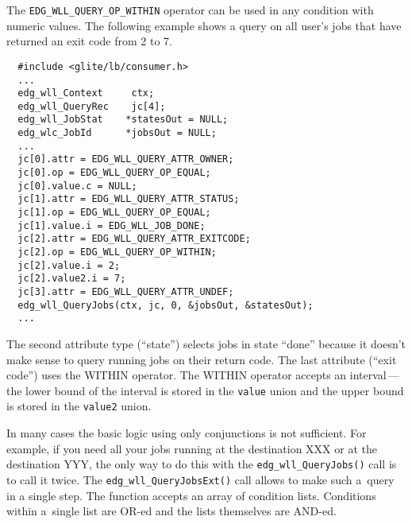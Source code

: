 The \texttt{EDG\_WLL\_QUERY\_OP\_WITHIN} operator can be used in any condition with numeric values.
The following example shows a query on all user's jobs that have returned 
an exit code from 2 to 7.
\begin{verbatim}
  #include <glite/lb/consumer.h>
  ...
  edg_wll_Context     ctx;    
  edg_wll_QueryRec    jc[4];
  edg_wll_JobStat    *statesOut = NULL;
  edg_wlc_JobId      *jobsOut = NULL;
  ...
  jc[0].attr = EDG_WLL_QUERY_ATTR_OWNER;
  jc[0].op = EDG_WLL_QUERY_OP_EQUAL;
  jc[0].value.c = NULL;
  jc[1].attr = EDG_WLL_QUERY_ATTR_STATUS;
  jc[1].op = EDG_WLL_QUERY_OP_EQUAL;
  jc[1].value.i = EDG_WLL_JOB_DONE;
  jc[2].attr = EDG_WLL_QUERY_ATTR_EXITCODE;
  jc[2].op = EDG_WLL_QUERY_OP_WITHIN;
  jc[2].value.i = 2;
  jc[2].value2.i = 7;
  jc[3].attr = EDG_WLL_QUERY_ATTR_UNDEF;
  edg_wll_QueryJobs(ctx, jc, 0, &jobsOut, &statesOut);
  ...
\end{verbatim}

The second attribute type (``state'') selects jobs in state ``done'' because it doesn't
make sense to query running jobs on their return code.
The last attribute (``exit code'') uses the WITHIN operator. The WITHIN operator accepts an
interval\,---\,the lower bound of the interval is stored in the \texttt{value} union and the
upper bound is stored in the \texttt{value2} union.

\label{JQ-AO}
In many cases the basic logic using only conjunctions is not sufficient.
For example, if you need all your jobs running at the destination XXX or at
the destination YYY, the only way to do this with the \texttt{edg\_wll\_QueryJobs()}
call is to call it twice. The \texttt{edg\_wll\_QueryJobsExt()} call allows to make
such a~query in a single step.
The function accepts an array of condition lists. Conditions within a~single list are
OR-ed and the lists themselves are AND-ed. 

